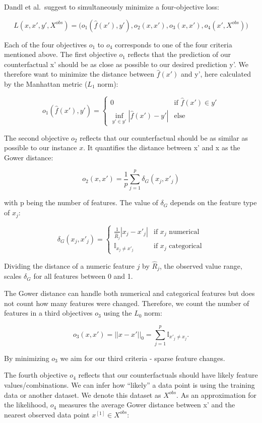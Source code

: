 \documentclass[
  12pt,
]{krantz}
\begin{document}
Dandl et al.~suggest to simultaneously minimize a four-objective loss:

\[L(x,x',y',X^{obs})=\big(o_1(\hat{f}(x'),y'),o_2(x, x'),o_3(x,x'),o_4(x',X^{obs})\big) \]

Each of the four objectives \(o_1\) to \(o_4\) corresponds to one of the four criteria mentioned above.
The first objective \(o_1\) reflects that the prediction of our counterfactual x' should be as close as possible to our desired prediction y'.
We therefore want to minimize the distance between \(\hat{f}(x')\) and y', here calculated by the Manhattan metric (\(L_1\) norm):

\[o_1(\hat{f}(x'),y')=\begin{cases}0&\text{if $\hat{f}(x')\in{}y'$}\\\inf\limits_{y'\in y'}|\hat{f}(x')-y'|&\text{else}\end{cases}\]

The second objective \(o_2\) reflects that our counterfactual should be as similar as possible to our instance \(x\).
It quantifies the distance between x' and x
as the Gower distance:

\[o_2(x,x')=\frac{1}{p}\sum_{j=1}^{p}\delta_G(x_j, x'_j)\]

with p being the number of features.
The value of \(\delta_G\) depends on the feature type of \(x_j\):

\[\delta_G(x_j,x'_j)=\begin{cases}\frac{1}{\widehat{R}_j}|x_j-x'_j|&\text{if $x_j$ numerical}\\\mathbb{I}_{x_j\neq{}x'_j}&\text{if $x_j$ categorical}\end{cases}\]

Dividing the distance of a numeric feature \(j\) by \(\widehat{R}_j\), the observed value range, scales \(\delta_G\) for all features between 0 and 1.

The Gower distance can handle both numerical and categorical features but does not count how many features were changed.
Therefore, we count the number of features in a third objectives \(o_3\) using the \(L_0\) norm:

\[o_3(x,x')=||x-x'||_0=\sum_{j=1}^{p}\mathbb{I}_{x'_j\neq x_j}.\]

By minimizing \(o_3\) we aim for our third criteria - sparse feature changes.

The fourth objective \(o_4\) reflects that our counterfactuals should have likely feature values/combinations.
We can infer how ``likely'' a data point is using the training data or another dataset.
We denote this dataset as \(X^{obs}\).
As an approximation for the likelihood, \(o_4\) measures the average Gower distance between x' and the nearest observed data point \(x^{[1]}\in{}X^{obs}\):
\end{document}
